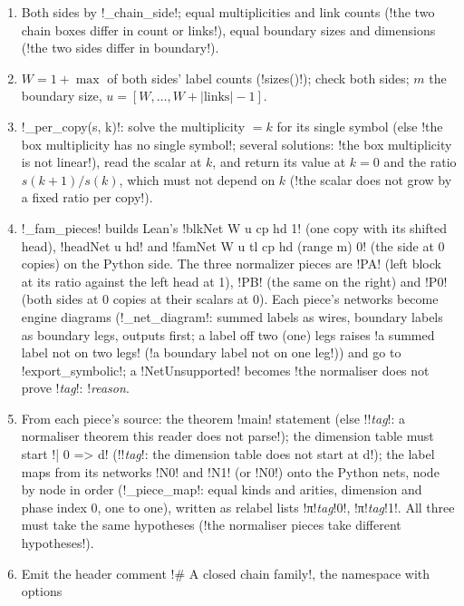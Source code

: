 {\begin{algorithm}\label{alg:lean-export-net-chainfam}
\begin{enumerate}
\item Both sides by \py!_chain_side!; equal multiplicities and link counts
  (\code!the two chain boxes differ in count or links!), equal boundary sizes and dimensions
  (\code!the two sides differ in boundary!).
\item $W = 1 + \max$ of both sides' label counts (\py!sizes()!); check both sides; $m$ the
  boundary size, $u = [W, \dots, W + |\text{links}| - 1]$.
\item \py!_per_copy(s, k)!: solve the multiplicity $= k$ for its single symbol (else
  \code!the box multiplicity has no single symbol!; several solutions:
  \code!the box multiplicity is not linear!), read the scalar at $k$, and return its value at
  $k = 0$ and the ratio $s(k+1)/s(k)$, which must not depend on $k$
  (\code!the scalar does not grow by a fixed ratio per copy!).
\item \py!_fam_pieces! builds Lean's \lean!blkNet W u cp hd 1! (one copy with its shifted head),
  \lean!headNet u hd! and \lean!famNet W u tl cp hd (range m) 0! (the side at 0 copies) on the
  Python side. The three normalizer pieces are \code!PA! (left block at its ratio against the left
  head at 1), \code!PB! (the same on the right) and \code!P0! (both sides at 0 copies at their
  scalars at 0). Each piece's networks become engine diagrams (\py!_net_diagram!: summed labels
  as wires, boundary labels as boundary legs, outputs first; a label off two (one) legs raises
  \code!a summed label not on two legs! (\code!a boundary label not on one leg!)) and go to
  \py!export_symbolic!; a \py!NetUnsupported! becomes
  \code!the normaliser does not prove !\textit{tag}\code!: !\textit{reason}.
\item From each piece's source: the theorem \code!main! statement (else
  \code!!\textit{tag}\code!: a normaliser theorem this reader does not parse!); the dimension
  table must start \code!| 0 => d! (\code!!\textit{tag}\code!: the dimension table does not start at d!);
  the label maps from its networks \code!N0! and \code!N1! (or \code!N0!) onto the Python nets,
  node by node in order (\py!_piece_map!: equal kinds and arities, dimension and phase index 0, one
  to one), written as relabel lists \code!π!\textit{tag}\code!0!, \code!π!\textit{tag}\code!1!.
  All three must take the same hypotheses (\code!the normaliser pieces take different hypotheses!).
\item Emit the header comment \code!# A closed chain family!, the namespace with options

\end{enumerate}
\end{algorithm}}
